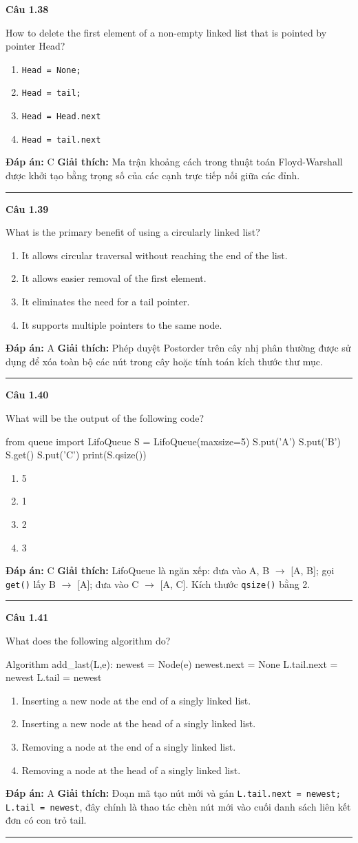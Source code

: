 \documentclass[11pt,a4paper]{article}
\newenvironment{question}[1]{%
  \par\vspace{1em}\noindent\textbf{\large Câu #1}\par\vspace{0.4em}
}{%
  \par\vspace{1em}\hrule\vspace{0.6em}
}
\newenvironment{choices}{%
  \begin{enumerate}[label=\textbf{\Alph*.},leftmargin=2.2em,itemsep=2pt,topsep=3pt]
}{%
  \end{enumerate}
}
\newcommand{\choice}{\item}
\newenvironment{codebox}{%
  \begin{tcolorbox}[colback=gray!8!white,colframe=gray!50!black,arc=1.5mm,boxrule=0.6pt,left=3mm,right=3mm,top=2.5mm,bottom=2.5mm]
  \ttfamily\small
}{%
  \end{tcolorbox}
}
\begin{document}
\begin{question}{1.38}
How to delete the first element of a non-empty linked list that is pointed by pointer Head?
\begin{choices}
\choice \texttt{Head = None;}
\choice \texttt{Head = tail;}
\choice \texttt{Head = Head.next}
\choice \texttt{Head = tail.next}
\end{choices}
\textbf{Đáp án:} C
\textbf{Giải thích:} Ma trận khoảng cách trong thuật toán Floyd-Warshall được khởi tạo bằng trọng số của các cạnh trực tiếp nối giữa các đỉnh.
\end{question}

\begin{question}{1.39}
What is the primary benefit of using a circularly linked list?
\begin{choices}
\choice It allows circular traversal without reaching the end of the list.
\choice It allows easier removal of the first element.
\choice It eliminates the need for a tail pointer.
\choice It supports multiple pointers to the same node.
\end{choices}
\textbf{Đáp án:} A
\textbf{Giải thích:} Phép duyệt Postorder trên cây nhị phân thường được sử dụng để xóa toàn bộ các nút trong cây hoặc tính toán kích thước thư mục.
\end{question}

\begin{question}{1.40}
What will be the output of the following code?
\begin{codebox}
from queue import LifoQueue
S = LifoQueue(maxsize=5)
S.put('A')
S.put('B')
S.get()
S.put('C')
print(S.qsize())
\end{codebox}
\begin{choices}
\choice 5
\choice 1
\choice 2
\choice 3
\end{choices}
\textbf{Đáp án:} C
\textbf{Giải thích:} LifoQueue là ngăn xếp: đưa vào A, B $\to$ [A, B]; gọi \texttt{get()} lấy B $\to$ [A]; đưa vào C $\to$ [A, C]. Kích thước \texttt{qsize()} bằng 2.
\end{question}

\begin{question}{1.41}
What does the following algorithm do?
\begin{codebox}
Algorithm add_last(L,e):
newest = Node(e)
newest.next = None
L.tail.next = newest
L.tail = newest
\end{codebox}
\begin{choices}
\choice Inserting a new node at the end of a singly linked list.
\choice Inserting a new node at the head of a singly linked list.
\choice Removing a node at the end of a singly linked list.
\choice Removing a node at the head of a singly linked list.
\end{choices}
\textbf{Đáp án:} A
\textbf{Giải thích:} Đoạn mã tạo nút mới và gán \texttt{L.tail.next = newest; L.tail = newest}, đây chính là thao tác chèn nút mới vào cuối danh sách liên kết đơn có con trỏ tail.
\end{question}
\end{document}
